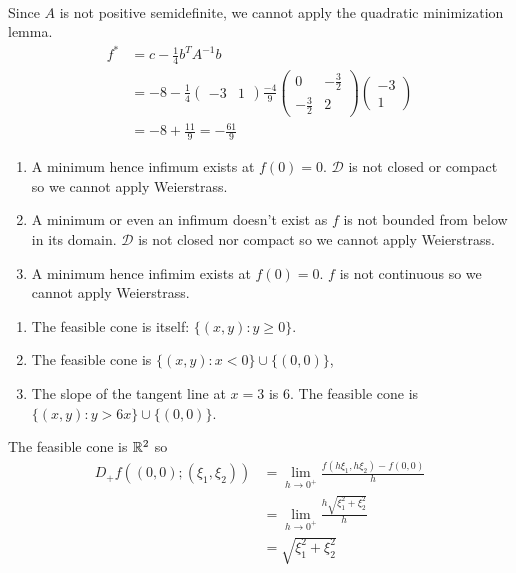 \documentclass[12pt]{article}
\begin{document}
\begin{problem}[2]
\begin{enumerate}[label=(\alph*)]
\begin{align*}
	\end{align*}
\end{enumerate}
Since $ A$ is not positive semidefinite, we cannot apply the quadratic minimization lemma.
 \begin{align*}
f^* &= c - \frac{1}{4}b^{T}A^{-1}b\\
	    &= -8 - \frac{1}{4} \begin{pmatrix} -3&1 \end{pmatrix} \frac{-4}{9}\begin{pmatrix} 0&-\frac{3}{2}\\-\frac{3}{2}&2 \end{pmatrix} \begin{pmatrix} -3\\1 \end{pmatrix}  \\
	    &=-8+\frac{11}{9} = - \frac{61}{9} 
\end{align*}

\end{problem}
\begin{problem}[3]
\begin{enumerate}[label=(\roman*)]
	\item A minimum hence infimum exists at $ f(0) = 0$. $ \mathcal{ D}$ is not closed or compact so we cannot apply Weierstrass.
	\item A minimum or even an infimum doesn't exist as $ f$ is not bounded from below in its domain. $ \mathcal{ D}$ is not closed nor compact so we cannot apply Weierstrass.
	\item  A minimum hence infimim exists at $ f(0) = 0$. $ f$ is not continuous so we cannot apply Weierstrass.
\end{enumerate}
\end{problem}

\begin{problem}[4]
\begin{enumerate}[label=(\roman*)]
	\item The feasible cone is itself: $ \{(x,y):y \geq 0\} $.
	\item The feasible cone is $ \{(x,y):x < 0\} \cup \{(0,0)\}$,
	\item The slope of the tangent line at $ x=3$ is 6. The feasible cone is $ \{(x,y): y > 6x\} \cup \{(0,0)\}  $.
\end{enumerate}
\end{problem}

\begin{problem}[5]
The feasible cone is $ \mathbb{R}^2$ so
\begin{align*}
	D_+f((0,0);(\xi_1,\xi_2)) &= \lim_{ h \to 0^+} \frac{f(h\xi_1,h\xi_2) - f(0,0)}{ h} \\
	&=\lim_{ h \to 0^+} \frac{h \sqrt{\xi_1^2+\xi_2^2} }{ h}   \\
	&=\sqrt{ \xi_1^2+ \xi_2^2}  
\end{align*}
\end{problem}
\end{document}
